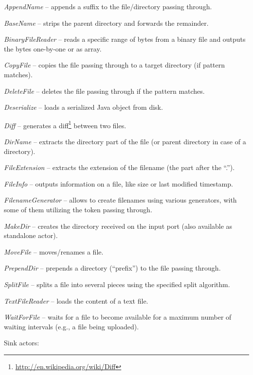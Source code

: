 \begin{tight_itemize}
	\item \textit{AppendName} -- appends a suffix to the file/directory passing
	through.
	\item \textit{BaseName} -- strips the parent directory and forwards the
	remainder.
	\item \textit{BinaryFileReader} -- reads a specific range of bytes from 
	a binary file and outputs the bytes one-by-one or as array.
	\item \textit{CopyFile} -- copies the file passing through to a target
	directory (if pattern matches).
	\item \textit{DeleteFile} -- deletes the file passing through if the pattern
	matches.
	\item \textit{Deserialize} -- loads a serialized Java object from disk.
	\item \textit{Diff} -- generates a diff\footnote{\url{http://en.wikipedia.org/wiki/Diff}{}} 
	between two files.
	\item \textit{DirName} -- extracts the directory part of the file (or parent
	directory in case of a directory).
	\item \textit{FileExtension} -- extracts the extension of the filename (the
	part after the ``.'').
	\item \textit{FileInfo} -- outputs information on a file, like size or last
	modified timestamp.
	\item \textit{FilenameGenerator} -- allows to create filenames using various
	generators, with some of them utilizing the token passing through.
	\item \textit{MakeDir} -- creates the directory received on the input port
	(also available as standalone actor).
	\item \textit{MoveFile} -- moves/renames a file.
	\item \textit{PrependDir} -- prepends a directory (``prefix'') to the file
	passing through.
	\item \textit{SplitFile} -- splits a file into several pieces using the 
	specified split algorithm.
	\item \textit{TextFileReader} -- loads the content of a text file.
	\item \textit{WaitForFile} -- waits for a file to become available for
	a maximum number of waiting intervals (e.g., a file being uploaded).
\end{tight_itemize}
Sink actors:
